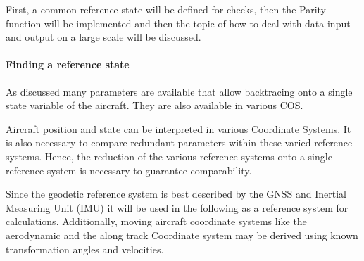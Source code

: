 First, a common reference state will be defined for checks, then the Parity function \cite{chap:parity_equation} will be implemented and then the topic of how to deal with data input and output on a large scale will be discussed.

\paragraph{Finding a reference state}

As discussed many parameters are available that allow backtracing onto a single state variable of the aircraft. They are also available in various COS.

Aircraft position and state can be interpreted in various Coordinate Systems. It is also necessary to compare redundant parameters within these varied reference systems. Hence, the reduction of the various reference systems onto a single reference system is necessary to guarantee comparability.

Since the geodetic reference system is best described by the GNSS and Inertial Measuring Unit (IMU) it will be used in the following as a reference system for calculations. Additionally, moving aircraft coordinate systems like the aerodynamic and the along track Coordinate system may be derived using known transformation angles and velocities. \cite{brockhaus_flugregelung_2011}




